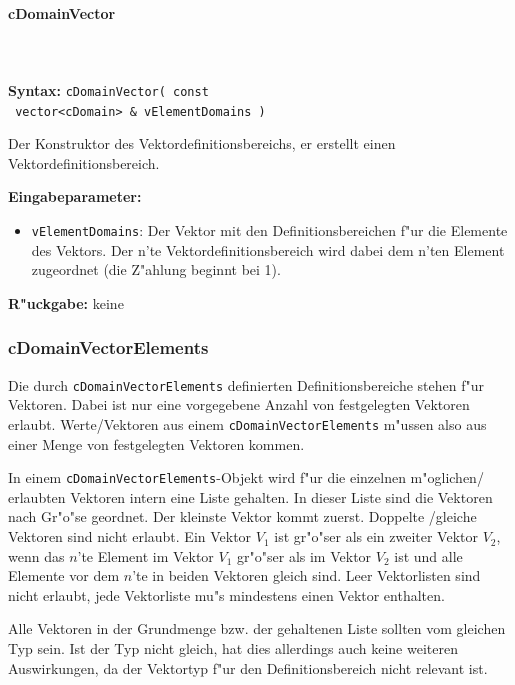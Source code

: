 \paragraph{cDomainVector}

\ \\\\\noindent
\textbf{Syntax:} \verb|cDomainVector( const| \\\verb| vector<cDomain> & vElementDomains )|

\bigskip\noindent
Der Konstruktor des Vektordefinitionsbereichs, er erstellt einen Vektordefinitionsbereich.

\bigskip\noindent
\textbf{Eingabeparameter:}
\begin{itemize}
 \item \verb|vElementDomains|: Der Vektor mit den Definitionsbereichen f"ur die Elemente des Vektors. Der n'te Vektordefinitionsbereich wird dabei dem n'ten Element zugeordnet (die Z"ahlung beginnt bei 1).
\end{itemize}

\bigskip\noindent
\textbf{R"uckgabe:} keine


\subsubsection{cDomainVectorElements}

Die durch \verb|cDomainVectorElements| definierten Definitionsbereiche stehen f"ur Vektoren.
Dabei ist nur eine vorgegebene Anzahl von festgelegten Vektoren erlaubt. Werte/Vektoren aus einem \verb|cDomainVectorElements| m"ussen also aus einer Menge von festgelegten Vektoren kommen.

In einem \verb|cDomainVectorElements|-Objekt wird f"ur die einzelnen m"oglichen/ erlaubten Vektoren intern eine Liste gehalten. In dieser Liste sind die Vektoren nach Gr"o"se geordnet. Der kleinste Vektor kommt zuerst. Doppelte /gleiche Vektoren sind nicht erlaubt. Ein Vektor $V_1$ ist gr"o"ser als ein zweiter Vektor $V_2$, wenn das $n$'te Element im Vektor $V_1$ gr"o"ser als im Vektor $V_2$ ist und alle Elemente vor dem $n$'te in beiden Vektoren gleich sind.
Leer Vektorlisten sind nicht erlaubt, jede Vektorliste mu"s mindestens einen Vektor enthalten.

Alle Vektoren in der Grundmenge bzw. der gehaltenen Liste sollten vom gleichen Typ sein. Ist der Typ nicht gleich, hat dies allerdings auch keine weiteren Auswirkungen, da der Vektortyp f"ur den Definitionsbereich nicht relevant ist.


